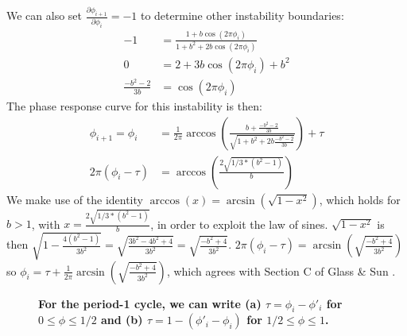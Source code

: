 \noindent We can also set $\frac{\partial \phi_{i+1}}{\partial \phi_i} = -1$ to determine other instability boundaries:
\begin{align}
    -1 &= \frac{1+b\cos(2\pi \phi_i)}{1 + b^2 + 2b\cos(2\pi \phi_i)} \nonumber \\
    0 &= 2+3b\cos(2\pi \phi_i) + b^2 \nonumber \\
    \frac{-b^2-2}{3b} &= \cos(2\pi \phi_i)
    \label{eq: square} 
\end{align}
The phase response curve for this instability is then:
\begin{align}
    \phi_{i+1} = \phi_i &= \frac{1}{2\pi}\arccos(\frac{b+\frac{-b^2-2}{3b}}{\sqrt{1+b^2+2b\frac{-b^2-2}{3b}}}) + \tau \nonumber \\
    2\pi(\phi_i - \tau) &= \arccos(\frac{2\sqrt{1/3*(b^2-1)}}{b})
\end{align} 
We make use of the identity $\arccos(x) = \arcsin(\sqrt{1-x^2})$, which holds for $b>1$, with $x = \frac{2\sqrt{1/3*(b^2-1)}}{b}$, in order to exploit the law of sines. $\sqrt{1-x^2}$ is then $\sqrt{1-\frac{4(b^2-1)}{3b^2}} = \sqrt{\frac{3b^2-4b^2+4}{3b^2}} = \sqrt{\frac{-b^2+4}{3b^2}}$. $2\pi(\phi_i - \tau) = \arcsin(\sqrt{\frac{-b^2+4}{3b^2}})$ so $\phi_i = \tau +\frac{1}{2\pi}\arcsin(\sqrt{\frac{-b^2+4}{3b^2}})$, which agrees with Section C of Glass \& Sun \supercite{GLASS1994}.

\begin{figure}[tbph]
    \medskip
    \caption{\textbf{For the period-1 cycle, we can write (a) $\tau = \phi_i - \phi'_i$ for $0\leq \phi \leq1/2$ and (b) $\tau = 1-(\phi'_i - \phi_i)$ for $1/2\leq \phi \leq1$.}}
    \label{sines}
\end{figure}

